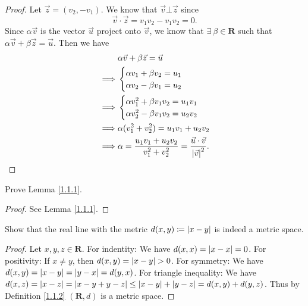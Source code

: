\begin{proof}
    Let \(\vec{z} = (v_2, -v_1)\).
    We know that \(\vec{v} \bot \vec{z}\) since
    \[
        \vec{v} \cdot \vec{z} = v_1 v_2 - v_1 v_2 = 0.
    \]
    Since \(\alpha \vec{v}\) is the vector \(\vec{u}\) project onto \(\vec{v}\), we know that \(\exists\ \beta \in \mathbf{R}\) such that \(\alpha \vec{v} + \beta \vec{z} = \vec{u}\).
    Then we have
    \begin{align*}
                 & \alpha \vec{v} + \beta \vec{z} = \vec{u}                                                           \\
        \implies & \begin{cases}
            \alpha v_1 + \beta v_2 = u_1 \\
            \alpha v_2 - \beta v_1 = u_2
        \end{cases}                                                                         \\
        \implies & \begin{cases}
            \alpha v_1^2 + \beta v_1 v_2 = u_1 v_1 \\
            \alpha v_2^2 - \beta v_1 v_2 = u_2 v_2
        \end{cases}                                                                         \\
        \implies & \alpha (v_1^2 + v_2^2) = u_1 v_1 + u_2 v_2                                                         \\
        \implies & \alpha = \frac{u_1 v_1 + u_2 v_2}{v_1^2 + v_2^2} = \frac{\vec{u} \cdot \vec{v}}{\abs*{\vec{v}}^2}.
    \end{align*}
\end{proof}

\exercisesection

\begin{exercise}\label{ex 1.1.1}
    Prove Lemma \ref{1.1.1}.
\end{exercise}

\begin{proof}
    See Lemma \ref{1.1.1}.
\end{proof}

\begin{exercise}\label{ex 1.1.2}
    Show that the real line with the metric \(d(x, y) \coloneqq \abs*{x - y}\) is indeed a metric space.
\end{exercise}

\begin{proof}
    Let \(x, y, z \in \mathbf{R}\).
    For indentity:
    We have \(d(x, x) = \abs*{x - x} = 0\).
    For positivity:
    If \(x \neq y\), then \(d(x, y) = \abs*{x - y} > 0\).
    For symmetry:
    We have \(d(x, y) = \abs*{x - y} = \abs*{y - x} = d(y, x)\).
    For triangle inequality:
    We have \(d(x, z) = \abs*{x - z} = \abs*{x - y + y - z} \leq \abs*{x - y} + \abs*{y - z} = d(x, y) + d(y, z)\).
    Thus by Definition \ref{1.1.2} \((\mathbf{R}, d)\) is a metric space.
\end{proof}

